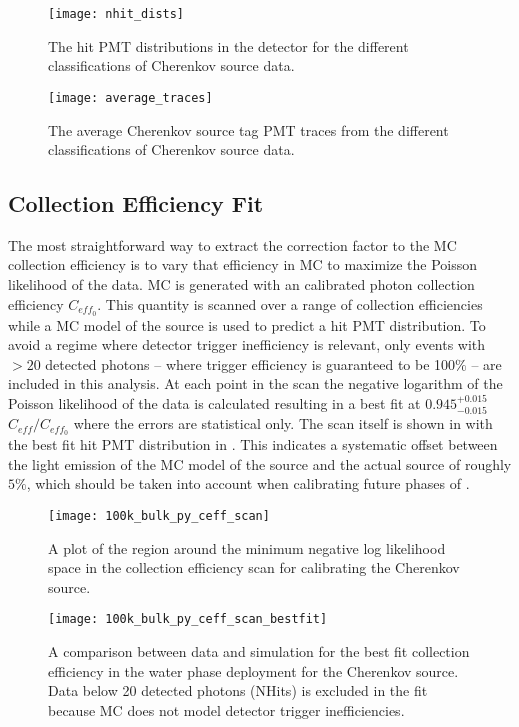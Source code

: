 \begin{figure}
\centering
\texttt{[image: nhit\_dists]}
\caption{\label{fig:chsrc_nhits} The hit PMT distributions in the {\snop} detector for the different classifications of Cherenkov source data.}
\end{figure}


\begin{figure}
\centering
\texttt{[image: average\_traces]}
\caption{\label{fig:chsrc_pmttraces} The average Cherenkov source tag PMT traces from the different classifications of Cherenkov source data.}
\end{figure}

\subsection{Collection Efficiency Fit}
\label{sec:water_fit}
The most straightforward way to extract the correction factor to the MC collection efficiency is to vary that efficiency in MC to maximize the Poisson likelihood of the data.
MC is generated with an \N calibrated photon collection efficiency $C_{eff_0}$.
This quantity is scanned over a range of collection efficiencies while a MC model of the source is used to predict a hit PMT distribution.
To avoid a regime where detector trigger inefficiency is relevant, only events with $>20$ detected photons -- where trigger efficiency is guaranteed to be 100$\%$ -- are included in this analysis.
At each point in the scan the negative logarithm of the Poisson likelihood of the data is calculated resulting in a best fit at $0.945^{+0.015}_{-0.015}$~$C_{eff}/C_{eff_0}$ where the errors are statistical only.
The scan itself is shown in  with the best fit hit PMT distribution in .
This indicates a systematic offset between the light emission of the MC model of the source and the actual source of roughly $5\%$, which should be taken into account when calibrating future phases of {\snop}.

\begin{figure}
\centering
\texttt{[image: 100k\_bulk\_py\_ceff\_scan]}
\caption{\label{fig:chsrc_scan} A plot of the region around the minimum negative log likelihood space in the collection efficiency scan for calibrating the Cherenkov source.}
\end{figure}

\begin{figure}
\centering
\texttt{[image: 100k\_bulk\_py\_ceff\_scan\_bestfit]}
\caption{\label{fig:chsrc_bestfit} A comparison between data and simulation for the best fit collection efficiency in the water phase deployment for the Cherenkov source.
Data below 20 detected photons (NHits) is excluded in the fit because MC does not model detector trigger inefficiencies.}
\end{figure}

